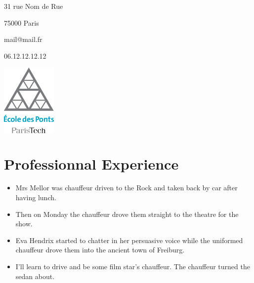\documentclass[a4paper,
		varspacetitle=-2mm, %
		varspacesection=2.5mm, %
		vartopmargin=0.8cm,  %
		varbottommargin=0.5cm %
	]{cv}
\begin{document}
    \begin{minipage}{.5\linewidth}
      \begin{flushleft}
	
    31 rue Nom de Rue 
    
    75000 Paris
    
	mail@mail.fr
	
	06.12.12.12.12
	
       
      \end{flushleft}
    \end{minipage}
    \begin{minipage}{.45\linewidth}
      \begin{flushright}
	\includegraphics[height=3.5cm]{photo_cv}
      \end{flushright}
    \end{minipage}

\subtitle{Sous-titre ici}


\section{Professionnal Experience}
\vspace{2mm}
  
\begin{itemize}[noitemsep,topsep=0pt,leftmargin=0.21\textwidth]
\item  Mrs Mellor was chauffeur driven to the Rock and taken back by car after having lunch.
\item Then on Monday the chauffeur drove them straight to the theatre for the show.
\item  Eva Hendrix started to chatter in her persuasive voice while the uniformed chauffeur drove them into the ancient town of Freiburg.
\item I'll learn to drive and be some film star's chauffeur. The chauffeur turned the sedan about.
\end{itemize}
\end{document}
